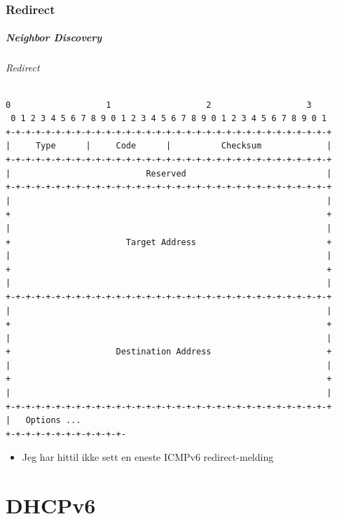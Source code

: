 \section{Redirect}
\begin{frame}[fragile]%
  \frametitle{Neighbor Discovery}
  \framesubtitle{Redirect}
\begin{Verbatim}[fontsize=\tiny]
 0                   1                   2                   3
 0 1 2 3 4 5 6 7 8 9 0 1 2 3 4 5 6 7 8 9 0 1 2 3 4 5 6 7 8 9 0 1
+-+-+-+-+-+-+-+-+-+-+-+-+-+-+-+-+-+-+-+-+-+-+-+-+-+-+-+-+-+-+-+-+
|     Type      |     Code      |          Checksum             |
+-+-+-+-+-+-+-+-+-+-+-+-+-+-+-+-+-+-+-+-+-+-+-+-+-+-+-+-+-+-+-+-+
|                           Reserved                            |
+-+-+-+-+-+-+-+-+-+-+-+-+-+-+-+-+-+-+-+-+-+-+-+-+-+-+-+-+-+-+-+-+
|                                                               |
+                                                               +
|                                                               |
+                       Target Address                          +
|                                                               |
+                                                               +
|                                                               |
+-+-+-+-+-+-+-+-+-+-+-+-+-+-+-+-+-+-+-+-+-+-+-+-+-+-+-+-+-+-+-+-+
|                                                               |
+                                                               +
|                                                               |
+                     Destination Address                       +
|                                                               |
+                                                               +
|                                                               |
+-+-+-+-+-+-+-+-+-+-+-+-+-+-+-+-+-+-+-+-+-+-+-+-+-+-+-+-+-+-+-+-+
|   Options ...
+-+-+-+-+-+-+-+-+-+-+-+-
\end{Verbatim}
  \begin{itemize}%
  \item Jeg har hittil ikke sett en eneste ICMPv6 redirect-melding
  \end{itemize}
\end{frame}

\part{DHCPv6}

\begin{frame}
  \partpage
\end{frame}

